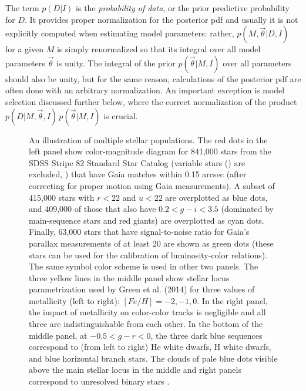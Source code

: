 The term $p(D|I)$ is the {\it probability of data}, or the prior predictive probability for $D$. 
It provides proper normalization for the posterior  pdf and usually it is not explicitly computed
when estimating model parameters: rather, $p(M,\vec{\theta}|D,I)$ for a given $M$
is simply renormalized so that
its integral over all model parameters $\vec{\theta}$ is unity.  The integral of the prior $p(\vec{\theta}|M,I)$
over all parameters should also be unity, but for the same reason, calculations of the posterior pdf are
often done with an arbitrary normalization. An important exception is model selection discussed further
below, where the correct normalization of the product $p(D|M,\vec{\theta},I) \, p(\vec{\theta}|M,I)$ is crucial. 



\begin{figure}[t!]
\caption{An illustration of multiple stellar populations. The red dots in the left panel show color-magnitude diagram for 841,000 stars from the SDSS Stripe 82 Standard Star Catalog
(variable stars () are excluded, \citealt{2021MNRAS.505.5941T}) that have Gaia matches within 0.15 arcsec (after correcting for proper motion using Gaia measurements). A subset of 415,000 stars with $r < 22$ and $u<22$ are overplotted as blue dots, and 409,000 of those that also have $0.2 < g-i < 3.5$ (dominated by main-sequence stars and red giants) are overplotted as cyan dots. Finally, 63,000 stars that have signal-to-noise ratio for Gaia’s parallax measurements of at least 20 are shown as green dots (these stars can be used for the calibration of luminosity-color relations). The same symbol color scheme is used in other two panels. The three yellow lines in the middle panel show stellar locus parametrization used by Green et al. (2014) for three values of metallicity (left to right): $[Fe/H] = -2, -1, 0$. In the right panel, the impact of metallicity on color-color tracks is negligible and all three are indistinguishable from each other. In the bottom of the middle panel, at $-0.5 < g-r < 0$, the three dark blue sequences correspond to (from left to right) He white dwarfs, H white dwarfs, and blue horizontal branch stars. The clouds of pale blue dots visible above the main stellar locus in the middle and right panels correspond to unresolved binary stars \citep{2004ApJ...615L.141S}.} \label{fig:3dataDiags}
\end{figure}



